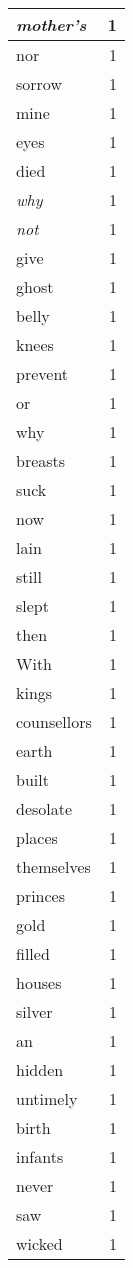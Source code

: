 \begin{center}
\begin{longtable}{l|r}
\emph{mother's} & 1\\ \hline 
nor & 1\\ \hline 
sorrow & 1\\ \hline 
mine & 1\\ \hline 
eyes & 1\\ \hline 
died & 1\\ \hline 
\emph{why} & 1\\ \hline 
\emph{not} & 1\\ \hline 
give & 1\\ \hline 
ghost & 1\\ \hline 
belly & 1\\ \hline 
knees & 1\\ \hline 
prevent & 1\\ \hline 
or & 1\\ \hline 
why & 1\\ \hline 
breasts & 1\\ \hline 
suck & 1\\ \hline 
now & 1\\ \hline 
lain & 1\\ \hline 
still & 1\\ \hline 
slept & 1\\ \hline 
then & 1\\ \hline 
With & 1\\ \hline 
kings & 1\\ \hline 
counsellors & 1\\ \hline 
earth & 1\\ \hline 
built & 1\\ \hline 
desolate & 1\\ \hline 
places & 1\\ \hline 
themselves & 1\\ \hline 
princes & 1\\ \hline 
gold & 1\\ \hline 
filled & 1\\ \hline 
houses & 1\\ \hline 
silver & 1\\ \hline 
an & 1\\ \hline 
hidden & 1\\ \hline 
untimely & 1\\ \hline 
birth & 1\\ \hline 
infants & 1\\ \hline 
never & 1\\ \hline 
saw & 1\\ \hline 
wicked & 1\\ \hline 

\end{longtable}
\end{center}
